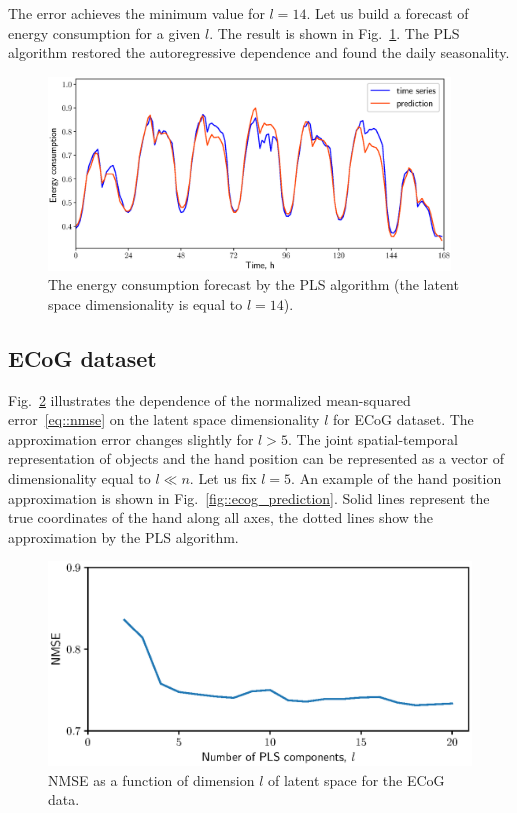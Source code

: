 \documentclass[preprint,12pt]{elsarticle}
\begin{document}
The error achieves the minimum value for $l=14$. 
Let us build a forecast of energy consumption for a given $l$. 
The result is shown in Fig.~\ref{fig::energy_prediction}. 
The PLS algorithm restored the autoregressive dependence and found the daily seasonality.

\begin{figure}[!h]
	\centering
	\includegraphics[width=0.95\textwidth]{figs/energy_prediction}
	\caption{The energy consumption forecast by the PLS algorithm (the latent space dimensionality is equal to $l=14$).}
	\label{fig::energy_prediction}
\end{figure}

\subsection{ECoG dataset}
Fig.~\ref{fig::ecog_n_comp} illustrates the dependence of the normalized mean-squared error~\eqref{eq::nmse} on the latent space dimensionality $l$ for ECoG dataset. 
The approximation error changes slightly for $l > 5$.
The joint spatial-temporal representation of objects and the hand position can be represented as a vector of dimensionality equal to $l \ll n$.
Let us fix $l = 5$. 
An example of the hand position approximation is shown in Fig.~\ref{fig::ecog_prediction}. 
Solid lines represent the true coordinates of the hand along all axes, the dotted lines show the approximation by the PLS algorithm.

\begin{figure}[!h]
	\centering
	\includegraphics[width=0.75\linewidth]{figs/ecog_n_comp}	
	\caption{NMSE as a function of dimension $l$ of latent space for the ECoG data.}
	\label{fig::ecog_n_comp}
\end{figure}
\end{document}
